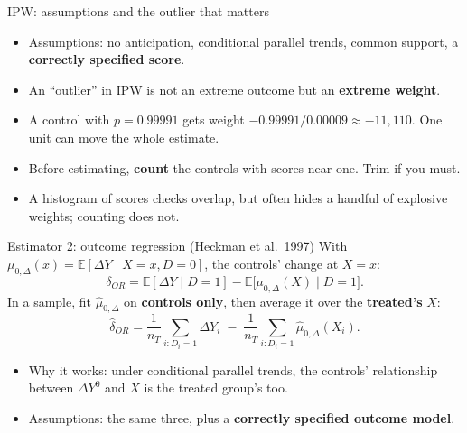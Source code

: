 \documentclass[
  11pt,
  ignorenonframetext,
  aspectratio=169,
]{beamer}
\providecommand{\tightlist}{%
  \setlength{\itemsep}{0pt}\setlength{\parskip}{0pt}}
\begin{document}
\begin{frame}{IPW: assumptions and the outlier that matters}
\protect{}\label{ipw-assumptions-and-the-outlier-that-matters}
\begin{itemize}
\tightlist
\item
  Assumptions: no anticipation, conditional parallel trends, common
  support, a \textbf{correctly specified score}.
\item
  An ``outlier'' in IPW is not an extreme outcome but an \textbf{extreme
  weight}.
\item
  A control with \(p = 0.99991\) gets weight
  \(-0.99991/0.00009 \approx -11{,}110\). One unit can move the whole
  estimate.
\item
  Before estimating, \textbf{count} the controls with scores near one.
  Trim if you must.
\item
  A histogram of scores checks overlap, but often hides a handful of
  explosive weights; counting does not.
\end{itemize}
\end{frame}

\begin{frame}{Estimator 2: outcome regression (Heckman et al.~1997)}
\protect{}\label{estimator-2-outcome-regression-heckman-et-al.-1997}
With \(\mu_{0,\Delta}(x) = \mathbb{E}[\Delta Y \mid X = x, D=0]\), the
controls' change at \(X = x\): \[
\delta_{OR} = \mathbb{E}[\Delta Y \mid D=1] - \mathbb{E}\big[\mu_{0,\Delta}(X) \mid D=1\big].
\] In a sample, fit \(\hat\mu_{0,\Delta}\) on \textbf{controls only},
then average it over the \textbf{treated's} \(X\): \[
\hat\delta_{OR} = \frac{1}{n_T}\sum_{i: D_i = 1} \Delta Y_i \;-\; \frac{1}{n_T}\sum_{i: D_i = 1}\hat\mu_{0,\Delta}(X_i).
\]

\begin{itemize}
\tightlist
\item
  Why it works: under conditional parallel trends, the controls'
  relationship between \(\Delta Y^0\) and \(X\) is the treated group's
  too.
\item
  Assumptions: the same three, plus a \textbf{correctly specified
  outcome model}.
\end{itemize}
\end{frame}
\end{document}
